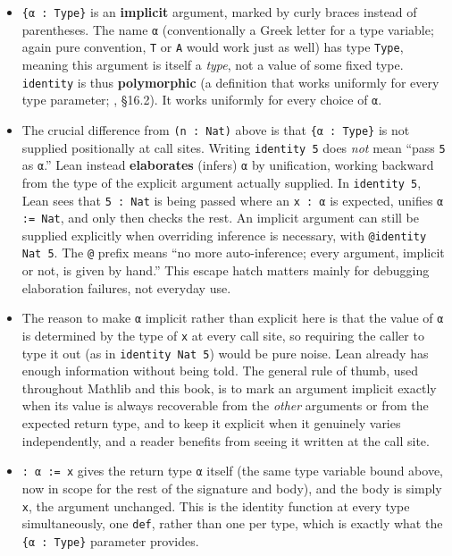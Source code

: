 \begin{itemize}
\tightlist
\item
  \texttt{\{α : Type\}} is an \textbf{implicit} argument, marked by curly braces instead of parentheses. The name \texttt{α} (conventionally a Greek letter for a type variable; again pure convention, \texttt{T} or \texttt{A} would work just as well) has type \texttt{Type}, meaning this argument is itself a \emph{type}, not a value of some fixed type. \texttt{identity} is thus \textbf{polymorphic} (a definition that works uniformly for every type parameter; \cite{Pierce2002}, §16.2). It works uniformly for every choice of \texttt{α}.
\item
  The crucial difference from \texttt{(n : Nat)} above is that \texttt{\{α : Type\}} is not supplied positionally at call sites. Writing \texttt{identity 5} does \emph{not} mean ``pass \texttt{5} as \texttt{α}.'' Lean instead \textbf{elaborates} (infers) \texttt{α} by unification, working backward from the type of the explicit argument actually supplied. In \texttt{identity 5}, Lean sees that \texttt{5 : Nat} is being passed where an \texttt{x : α} is expected, unifies \texttt{α := Nat}, and only then checks the rest. An implicit argument can still be supplied explicitly when overriding inference is necessary, with \texttt{@identity Nat 5}. The \texttt{@} prefix means ``no more auto-inference; every argument, implicit or not, is given by hand.'' This escape hatch matters mainly for debugging elaboration failures, not everyday use.
\item
  The reason to make \texttt{α} implicit rather than explicit here is that the value of \texttt{α} is determined by the type of \texttt{x} at every call site, so requiring the caller to type it out (as in \texttt{identity Nat 5}) would be pure noise. Lean already has enough information without being told. The general rule of thumb, used throughout Mathlib and this book, is to mark an argument implicit exactly when its value is always recoverable from the \emph{other} arguments or from the expected return type, and to keep it explicit when it genuinely varies independently, and a reader benefits from seeing it written at the call site.
\item
  \texttt{: α := x} gives the return type \texttt{α} itself (the same type variable bound above, now in scope for the rest of the signature and body), and the body is simply \texttt{x}, the argument unchanged. This is the identity function at every type simultaneously, one \texttt{def}, rather than one per type, which is exactly what the \texttt{\{α : Type\}} parameter provides.
\end{itemize}

